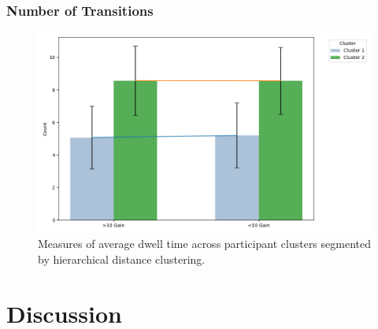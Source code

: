 \documentclass[man, floatsintext]{apa7}
\begin{document}
\subsubsection{Number of Transitions}

 \begin{figure}[H]
	\includegraphics[width=\linewidth]{../plots/GainCluster/NTransitions.png}
	\caption{Measures of average dwell time across participant clusters segmented by hierarchical distance clustering.}
	\label{fig:NTransitionPerGainByPIDCluster}
\end{figure}





\section{Discussion}



\printbibliography


\appendix

\end{document}
